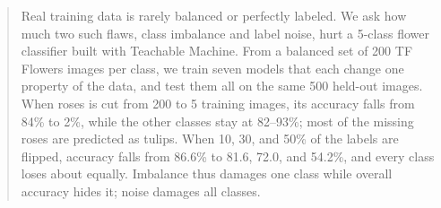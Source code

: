 \begin{abstract}
Real training data is rarely balanced or perfectly labeled.
We ask how much two such flaws, class imbalance and label noise, hurt a 5-class flower classifier built with
Teachable Machine.
From a balanced set of 200 TF Flowers images per class, we train seven models that each change one property of
the data, and test them all on the same 500 held-out images.
When roses is cut from 200 to 5 training images, its accuracy falls from 84\% to 2\%, while the other classes stay at
82--93\%; most of the missing roses are predicted as tulips.
When 10, 30, and 50\% of the labels are flipped, accuracy falls from 86.6\% to 81.6, 72.0, and 54.2\%, and every
class loses about equally.
Imbalance thus damages one class while overall accuracy hides it; noise damages all classes.
\end{abstract}
